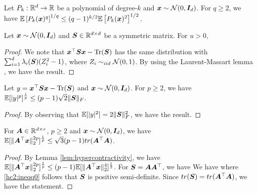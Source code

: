  

\begin{lemma}[Hypercontractivity]
\label{lem:hypercontractivity}
Let $P_k : \mathbb{R}^d \to \mathbb{R}$ be a polynomial of degree-$k$ and $\boldsymbol{x} \sim \mathcal{N}(0,\boldsymbol{I}_{d})$.  For $q \geq 2$, we have $
\mathbb{E}  \left[ P_k(\boldsymbol{x})^q \right]^{1/q} \leq (q-1)^{k/2}  \mathbb{E}  \left[ P_k(\boldsymbol{x})^2 \right]^{1/2} .$
\end{lemma}

\begin{lemma}
\label{lem:hansonwright}
Let  $\boldsymbol{x} \sim \mathcal{N}(0,\boldsymbol{I}_{d})$ and $\boldsymbol{S} \in \mathbb{R}^{d \times d}$ be a symmetric matrix.  For $u > 0$,
\end{lemma}

\begin{proof}
We note that   $\boldsymbol{x}^\top  \boldsymbol{S}  \boldsymbol{x}  - \text{Tr}(\boldsymbol{S})$ has the same distribution with $\sum_{i = 1}^d \lambda_i(\boldsymbol{S}) (Z_i^2 - 1)$, where   $Z_i \sim_{iid} \mathcal{N}(0,1)$.  By using the Laurent-Massart lemma \cite{LaurentMassart}, we have the result.
\end{proof}



\begin{corollary}
\label{cor:hc1}
Let  $y =   \boldsymbol{x}^\top \boldsymbol{S} \boldsymbol{x} - \text{Tr}(\boldsymbol{S})$  and $\boldsymbol{x} \sim \mathcal{N}(0,\boldsymbol{I}_{d})$.  For $p \geq 2$,  we have $\mathbb{E} [ \lvert y\rvert^p ]^{\frac{1}{p}} \leq (p-1) \sqrt{2} \lVert\boldsymbol{S}\rVert_F$.
\end{corollary}

\begin{proof}
By observing that  $\mathbb{E} [ \lvert y\rvert^2 ] = 2 \lVert\boldsymbol{S}\rVert_F^2$, we have the result.
\end{proof}

\begin{corollary}
\label{cor:hc2}
For $\boldsymbol{A} \in \mathbb{R}^{d \times r}$, $p \geq 2$ and $\boldsymbol{x} \sim \mathcal{N}(0,\boldsymbol{I}_{d})$, we have $ \mathbb{E}[\lVert\boldsymbol{A}^\top \boldsymbol{x}\rVert_2^{2p}]^{\frac{1}{p}} \leq  \sqrt{ 3 }  (p-1)  tr(\boldsymbol{A}^\top \boldsymbol{A})$.
\end{corollary}

\begin{proof}
By Lemma \ref{lem:hypercontractivity}, we have $ \mathbb{E}[\lVert\boldsymbol{A}^\top \boldsymbol{x}\rVert_2^{2p}]^{\frac{1}{p}} \leq  (p-1)   \mathbb{E}[\lVert\boldsymbol{A}^\top \boldsymbol{x}\rVert_2^{4}]^{\frac{1}{2}}$.   For $\boldsymbol{S} = \boldsymbol{A} \boldsymbol{A}^\top$, we have
We have
where  \eqref{hc2:ineqq0} follows that $\boldsymbol{S}$ is positive semi-definite.  Since $tr(\boldsymbol{S}) = tr(\boldsymbol{A}^\top \boldsymbol{A})$, we have the statement.
\end{proof}


